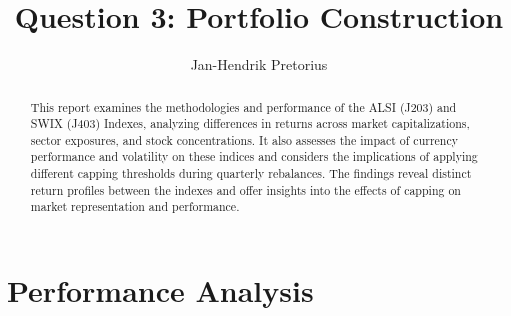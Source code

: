 \documentclass[11pt,preprint, authoryear]{elsarticle}
\numberwithin{equation}{section}
\numberwithin{figure}{section}
\numberwithin{table}{section}
\begin{document}
\begin{frontmatter}  %

\title{Question 3: Portfolio Construction}





\author[Add1]{Jan-Hendrik Pretorius}





\address[Add1]{Stellenbosch University}


\begin{abstract}
\small{
This report examines the methodologies and performance of the ALSI
(J203) and SWIX (J403) Indexes, analyzing differences in returns across
market capitalizations, sector exposures, and stock concentrations. It
also assesses the impact of currency performance and volatility on these
indices and considers the implications of applying different capping
thresholds during quarterly rebalances. The findings reveal distinct
return profiles between the indexes and offer insights into the effects
of capping on market representation and performance.
}
\end{abstract}

\vspace{1cm}





\vspace{0.5cm}

\end{frontmatter}

\setcounter{footnote}{0}



\pagestyle{fancy}
\chead{}
\lfoot{}
\lhead{}
\cfoot{}


\headsep 35pt %




\hypertarget{performance-analysis}{%
\section{Performance Analysis}\label{performance-analysis}}
\end{document}
